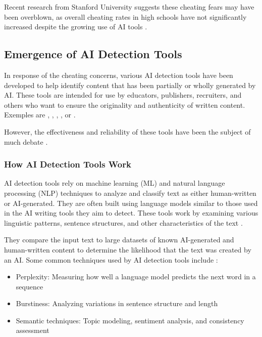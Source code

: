 \documentclass{article}
\begin{document}
Recent research from Stanford University suggests these cheating fears
may have been overblown, as overall cheating rates in high schools have
not significantly increased despite the growing use of AI tools
\cite{nytimes_chatbot_cheating}.

\subsection{Emergence of AI Detection Tools}
In response of the cheating concerns, various AI detection tools
have been developed to help identify content that has been partially
or wholly generated by AI.
These tools are intended for use by educators, publishers,
recruiters, and others who want to ensure the originality
and authenticity of written content.
Exemples are \cite[Originality.ai]{originality_ai},
\cite[Copyleaks]{copyleaks}, \cite[Quillbot]{quillbot},
\cite[GPTZero]{gptzero}, or \cite[Compilatio]{compilatio_ia_detecteur}.

However, the effectiveness and reliability of these tools
have been the subject of much debate
\cite{scribbr_ai_detectors} \cite{contadu_ai_detection} \cite{biomedcentral_ai_detection}.



\subsubsection{How AI Detection Tools Work}
AI detection tools rely on machine learning (ML)
and natural language processing (NLP) techniques to analyze and
classify text as either human-written or AI-generated.
They are often built using language models similar to those used
in the AI writing tools they aim to detect.
These tools work by examining various linguistic patterns, sentence structures,
and other characteristics of the text
\cite{surferseo_ai_content_detectors}
\cite{scribbr_ai_detectors}
\cite{contadu_ai_detection}.

They compare the input text to large datasets of known AI-generated
and human-written content to determine the likelihood that the text
was created by an AI.
Some common techniques used by AI detection tools include
\cite{surferseo_ai_content_detectors}
\cite{contadu_ai_detection}:

\begin{itemize}
    \item Perplexity: Measuring how well a language model predicts the next word in a sequence
    \item Burstiness: Analyzing variations in sentence structure and length
    \item Semantic techniques: Topic modeling, sentiment analysis, and consistency assessment
\end{itemize}
\end{document}
